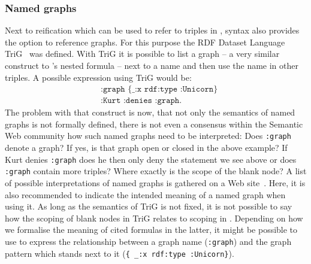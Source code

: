
% 

\subsubsection{Named graphs}
Next to reification which can be used to refer to triples in \rdf, \rdf syntax also provides the option to reference graphs. 
%
For this purpose the RDF Dataset Language TriG~\cite{TriG} was defined. With TriG it is possible to 
list a graph -- a very similar construct to \nthree's nested formula -- next to a name and then use the name in other triples. A possible expression using TriG would be:
\begin{equation}
 \begin{split}
& \texttt{:graph } \texttt{\{ \_:x rdf:type :Unicorn\}}\\
& \texttt{:Kurt } \texttt{:denies :graph.}
 \end{split}
\end{equation}
The problem with that construct is now, that not only the semantics of named graphs is not formally defined, there is not even a consensus within the Semantic Web community how 
such named graphs need to be interpreted: Does \texttt{:graph} denote a graph? If yes, is that graph open or closed in the above example? If Kurt denies \texttt{:graph} does he then only deny the statement we see above or does 
\texttt{:graph} contain more triples? Where exactly is the scope of the blank node? A list of possible interpretations of named graphs is gathered on a Web site~\cite{TriGsemantics}. 
Here, it is also recommended to indicate the intended meaning of a named graph when using it. As long as the semantics of TriG is not fixed, it is not possible to say how the scoping 
of blank nodes in TriG relates to scoping in \nthree. Depending on how we formalise the meaning of cited formulas in the latter, it might be possible to use \nthree to 
express the relationship between a graph name (\texttt{:graph}) and the graph pattern which stands next to it (\texttt{\{ \_:x rdf:type :Unicorn\}}).

